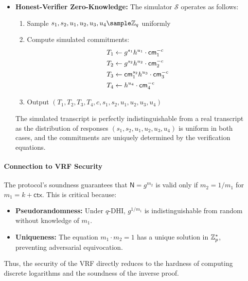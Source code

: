 \begin{itemize}
    \item \textbf{Honest-Verifier Zero-Knowledge:} The simulator $\mathcal{S}$ operates as follows:
    \begin{enumerate}
        \item Sample $s_1, s_2, u_1, u_2, u_3, u_4 \sample \Z_q$ uniformly
        \item Compute simulated commitments:
        \begin{align*}
            T_1 &\gets g^{s_1}h^{u_1} \cdot \mathsf{cm}_1^{-c}\\
            T_2 &\gets g^{s_2}h^{u_2} \cdot \mathsf{cm}_2^{-c}\\
            T_3 &\gets \mathsf{cm}_1^{s_2}h^{u_3} \cdot \mathsf{cm}_3^{-c}\\
            T_4 &\gets h^{u_4} \cdot \mathsf{cm}_4^{-c}
        \end{align*}
        \item Output $(T_1, T_2, T_3, T_4, c, s_1, s_2, u_1, u_2, u_3, u_4)$
    \end{enumerate}
    The simulated transcript is perfectly indistinguishable from a real transcript as the distribution of responses $(s_1, s_2, u_1, u_2, u_3, u_4)$ is uniform in both cases, and the commitments are uniquely determined by the verification equations.
\end{itemize}

\paragraph{Connection to VRF Security}  
The protocol’s soundness guarantees that $\textsf{N} = g^{m_2}$ is valid only if $m_2 = 1/m_1$ for $m_1 = k + \textsf{ctx}$. This is critical because:
\begin{itemize}
    \item \textbf{Pseudorandomness:} Under $q$-DHI, $g^{1/m_1}$ is indistinguishable from random without knowledge of $m_1$.
    \item \textbf{Uniqueness:} The equation $m_1 \cdot m_2 = 1$ has a unique solution in $\mathbb{Z}_p^*$, preventing adversarial equivocation.
\end{itemize}
Thus, the security of the VRF directly reduces to the hardness of computing discrete logarithms and the soundness of the inverse proof.





















